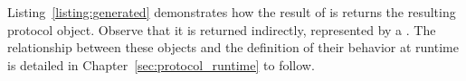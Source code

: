 Listing~\ref{listing:generated} demonstrates how the result of  is returns the resulting protocol object. Observe that it is returned indirectly, represented by a . The relationship between these objects and the definition of their behavior at runtime is detailed in Chapter~\ref{sec:protocol_runtime} to follow.

